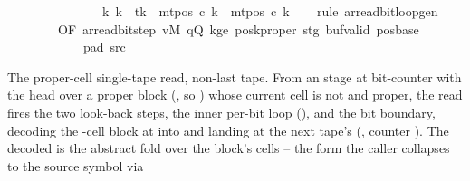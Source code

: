 \begin{isabellebody}
\ \ \ \ \ \ \ \ \ \ \ \ \ \ {\isasymand}\ {\isacharparenleft}{\kern0pt}{\isasymforall}k{\isacharprime}{\kern0pt}{\isachardot}{\kern0pt}\ k{\isacharprime}{\kern0pt}\ {\isasymnoteq}\ tk\ {\isasymlongrightarrow}\ mt{\isacharunderscore}{\kern0pt}pos\ c{\isacharprime}{\kern0pt}{\isacharprime}{\kern0pt}\ k{\isacharprime}{\kern0pt}\ {\isacharequal}{\kern0pt}\ mt{\isacharunderscore}{\kern0pt}pos\ c{\isacharprime}{\kern0pt}\ k{\isacharprime}{\kern0pt}{\isacharparenright}{\kern0pt}{\isachardoublequoteclose}\isanewline
%
\isadelimproof
\ \ %
\endisadelimproof
%
\isatagproof
{}\isamarkupfalse%
\ {\isacharparenleft}{\kern0pt}rule\ ar{\isacharunderscore}{\kern0pt}read{\isacharunderscore}{\kern0pt}bit{\isacharunderscore}{\kern0pt}loop{\isacharunderscore}{\kern0pt}gen\isanewline
\ \ \ \ \ \ \ \ {\isacharbrackleft}{\kern0pt}OF\ ar{\isacharunderscore}{\kern0pt}read{\isacharunderscore}{\kern0pt}bit{\isacharunderscore}{\kern0pt}step\ vM\ qQ\ kge{}\ posk{\isacharunderscore}{\kern0pt}proper\ stg\ buf{}{\isacharunderscore}{\kern0pt}valid\ pos{\isacharunderscore}{\kern0pt}base\isanewline
\ \ \ \ \ \ \ \ \ \ \ \ pad{}\ src{}{\isacharbrackright}{\kern0pt}{\isacharparenright}{\kern0pt}%
\endisatagproof
{\isafoldproof}%
%
\isadelimproof
%
\endisadelimproof
%
\begin{isamarkuptext}%
The proper-cell single-tape read, non-last tape.  From an
   stage at bit-counter  with the head over a
  proper block  (, so
  ) whose current cell is not  and  proper, the read fires the two look-back steps, the inner
  per-bit loop (), and the bit boundary,
  decoding the -cell block at  into  and landing at the next tape's 
  (, counter ).  The decoded  is the abstract fold  over the block's  cells --
  the form the caller collapses to the source symbol via

\end{isamarkuptext}
\end{isabellebody}
